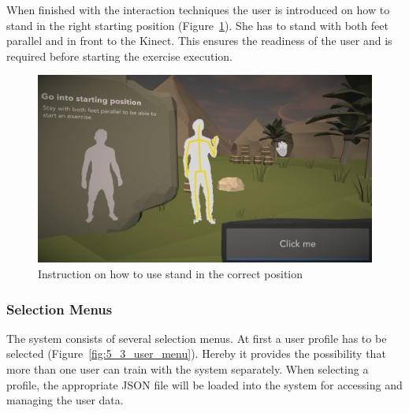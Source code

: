 When finished with the interaction techniques the user is introduced on how to stand in the right starting position (Figure~\ref{fig:5_3_standingPosition}). She has to stand with both feet parallel and in front to the Kinect. This ensures the readiness of the user and is required before starting the exercise execution.
\begin{figure}[htb]
	\centering
	\includegraphics[width=0.5\linewidth]{Pictures/5_Workflow/4_2_StartingPosition}
	\caption{Instruction on how to use stand in the correct position}
	\label{fig:5_3_standingPosition}
\end{figure}

\subsubsection{Selection Menus}
The system consists of several selection menus. At first a user profile has to be selected (Figure~\ref{fig:5_3_user_menu}). Hereby it provides the possibility that more than one user can train with the system separately.
When selecting a profile, the appropriate JSON file will be loaded into the system for accessing and managing the user data.

